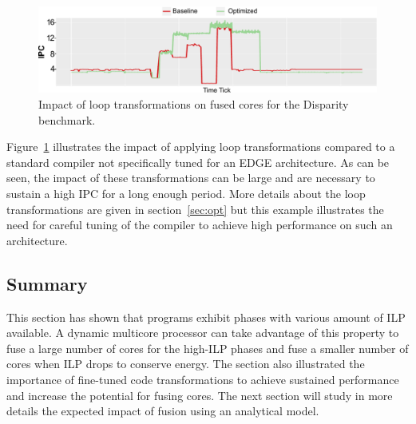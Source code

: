 \begin{figure}[t]
    \includegraphics[width=\textwidth]{cases-paper/graphics/motivation/code_opt_3.pdf}
    \caption{Impact of loop transformations on fused cores for the Disparity benchmark.} 
    \label{fig:compmotiv}
\vspace{5mm}
\end{figure}
Figure~\ref{fig:compmotiv} illustrates the impact of applying loop transformations compared to a standard compiler not specifically tuned for an EDGE architecture.
As can be seen, the impact of these transformations can be large and are necessary to sustain a high IPC for a long enough period.
More details about the loop transformations are given in section~\ref{sec:opt} but this example illustrates the need for careful tuning of the compiler to achieve high performance on such an architecture.

\subsection{Summary}
This section has shown that programs exhibit phases with various amount of ILP available.
A dynamic multicore processor can take advantage of this property to fuse a large number of cores for the high-ILP phases and fuse a smaller number of cores when ILP drops to conserve energy.
The section also illustrated the importance of fine-tuned code transformations to achieve sustained performance and increase the potential for fusing cores.
The next section will study in more details the expected impact of fusion using an analytical model.

